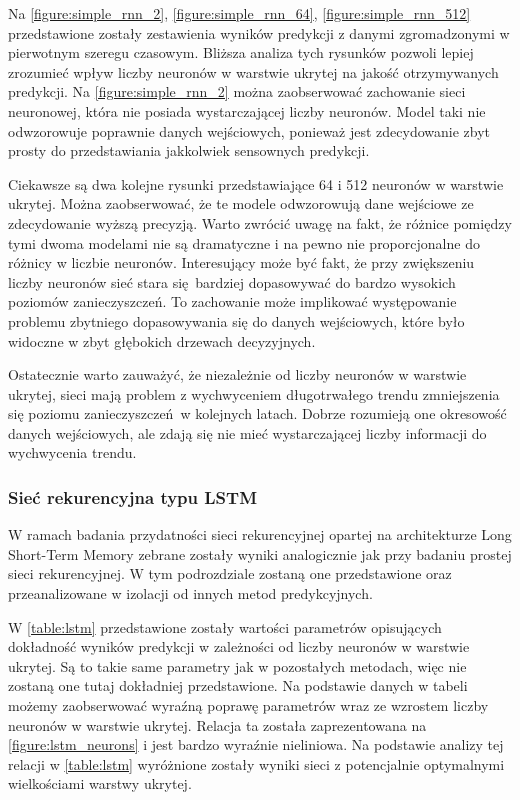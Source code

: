 \documentclass[10pt,a4paper]{article}
\begin{document}
Na \autoref{figure:simple_rnn_2}, \autoref{figure:simple_rnn_64}, \autoref{figure:simple_rnn_512} przedstawione zostały zestawienia wyników predykcji z danymi zgromadzonymi w pierwotnym szeregu czasowym. Bliższa analiza tych rysunków pozwoli lepiej zrozumieć wpływ liczby neuronów w warstwie ukrytej na jakość otrzymywanych predykcji. Na \autoref{figure:simple_rnn_2} można zaobserwować zachowanie sieci neuronowej, która nie posiada wystarczającej liczby neuronów. Model taki nie odwzorowuje poprawnie danych wejściowych, ponieważ jest zdecydowanie zbyt prosty do przedstawiania jakkolwiek sensownych predykcji. 

Ciekawsze są dwa kolejne rysunki przedstawiające 64 i 512 neuronów w warstwie ukrytej. Można zaobserwować, że te modele odwzorowują dane wejściowe ze zdecydowanie wyższą precyzją. Warto zwrócić uwagę na fakt, że różnice pomiędzy tymi dwoma modelami nie są dramatyczne i na pewno nie proporcjonalne do różnicy w liczbie neuronów. Interesujący może być fakt, że przy zwiększeniu liczby neuronów sieć stara się bardziej dopasowywać do bardzo wysokich poziomów zanieczyszczeń. To zachowanie może implikować występowanie problemu zbytniego dopasowywania się do danych wejściowych, które było widoczne w zbyt głębokich drzewach decyzyjnych.

Ostatecznie warto zauważyć, że niezależnie od liczby neuronów w warstwie ukrytej, sieci mają problem z wychwyceniem długotrwałego trendu zmniejszenia się poziomu zanieczyszczeń w kolejnych latach. Dobrze rozumieją one okresowość danych wejściowych, ale zdają się nie mieć wystarczającej liczby informacji do wychwycenia trendu. 
\newpage
\subsubsection{Sieć rekurencyjna typu LSTM}
\label{subsection:results:LSTM}
W ramach badania przydatności sieci rekurencyjnej opartej na architekturze Long Short-Term Memory zebrane zostały wyniki analogicznie jak przy badaniu prostej sieci rekurencyjnej. W tym podrozdziale zostaną one przedstawione oraz przeanalizowane w izolacji od innych metod predykcyjnych. 

W \autoref{table:lstm} przedstawione zostały wartości parametrów opisujących dokładność wyników predykcji w zależności od liczby neuronów w warstwie ukrytej. Są to takie same parametry jak w pozostałych metodach, więc nie zostaną one tutaj dokładniej przedstawione. Na podstawie danych w tabeli możemy zaobserwować wyraźną poprawę parametrów wraz ze wzrostem liczby neuronów w warstwie ukrytej. Relacja ta została zaprezentowana na \autoref{figure:lstm_neurons} i jest bardzo wyraźnie nieliniowa. Na podstawie analizy tej relacji w \autoref{table:lstm} wyróżnione zostały wyniki sieci z potencjalnie optymalnymi wielkościami warstwy ukrytej.
\end{document}
